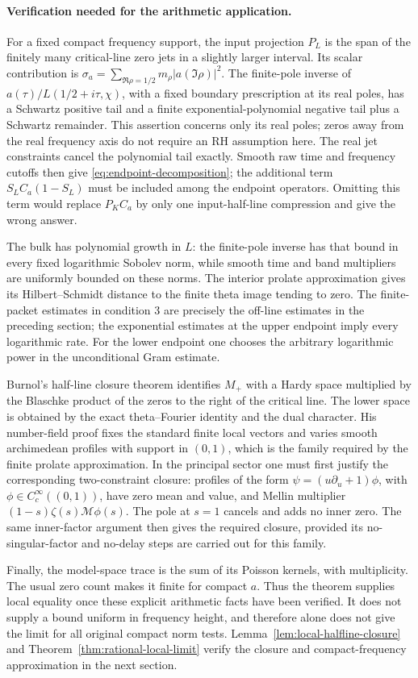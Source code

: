 \paragraph{Verification needed for the arithmetic application.}
For a fixed compact frequency support, the input projection $P_L$
is the span of the finitely many critical-line zero jets in a
slightly larger interval.  Its scalar contribution is
$\sigma_a=\sum_{\Re\rho=1/2}m_\rho|a(\Im\rho)|^2$.
The finite-pole inverse of $a(\tau)/L(1/2+i\tau,\chi)$, with a fixed
boundary prescription at its real poles, has a Schwartz positive
tail and a finite exponential-polynomial negative tail plus a
Schwartz remainder.  This assertion concerns only its real poles;
zeros away from the real frequency axis do not require an RH
assumption here.  The real jet constraints cancel the polynomial
tail exactly.  Smooth raw time and frequency cutoffs then give
\eqref{eq:endpoint-decomposition}; the additional term
$S_LC_a(1-S_L)$ must be included among the endpoint operators.
Omitting this term would replace $P_KC_a$ by only one input-half-line
compression and give the wrong answer.

The bulk has polynomial growth in $L$: the finite-pole inverse has
that bound in every fixed logarithmic Sobolev norm, while smooth
time and band multipliers are uniformly bounded on these norms.
The interior prolate approximation gives its Hilbert--Schmidt
distance to the finite theta image tending to zero.
The finite-packet estimates in condition 3 are precisely the
off-line estimates in the preceding section; the exponential
estimates at the upper endpoint imply every logarithmic rate.
For the lower endpoint one chooses the arbitrary logarithmic
power in the unconditional Gram estimate.

Burnol's half-line closure theorem identifies $M_+$ with a Hardy
space multiplied by the Blaschke product of the zeros to the right
of the critical line.  The lower space is obtained by the exact
theta--Fourier identity and the dual character.
His number-field proof fixes the standard finite local vectors and
varies smooth archimedean profiles with support in $(0,1)$, which
is the family required by the finite prolate approximation.
In the principal sector one must first justify the corresponding
two-constraint closure: profiles of the form
$\psi=(u\partial_u+1)\phi$, with $\phi\in C_c^\infty((0,1))$,
have zero mean and value, and Mellin multiplier
$(1-s)\zeta(s)\mathcal M\phi(s)$.
The pole at $s=1$ cancels and adds no inner zero.
The same inner-factor argument then gives the required closure,
provided its no-singular-factor and no-delay steps are carried out
for this family.

Finally, the model-space trace is the sum of its Poisson kernels,
with multiplicity.  The usual zero count makes it finite for
compact $a$.  Thus the theorem supplies local equality once these
explicit arithmetic facts have been verified.  It does not supply
a bound uniform in frequency height, and therefore alone does not
give the limit for all original compact norm tests.
Lemma~\ref{lem:local-halfline-closure} and
Theorem~\ref{thm:rational-local-limit} verify the closure and
compact-frequency approximation in the next section.
